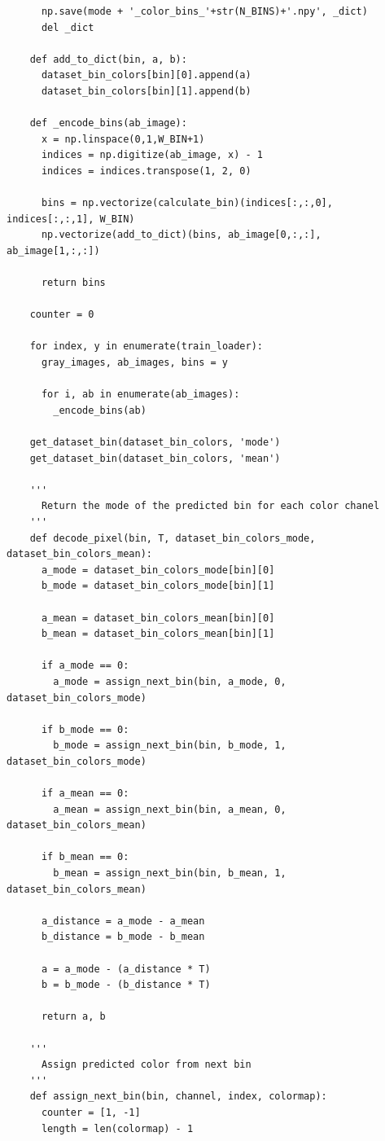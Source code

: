 \begin{longlisting}
\begin{verbatim}
      np.save(mode + '_color_bins_'+str(N_BINS)+'.npy', _dict)
      del _dict

    def add_to_dict(bin, a, b):
      dataset_bin_colors[bin][0].append(a)
      dataset_bin_colors[bin][1].append(b)

    def _encode_bins(ab_image):
      x = np.linspace(0,1,W_BIN+1)
      indices = np.digitize(ab_image, x) - 1
      indices = indices.transpose(1, 2, 0)
      
      bins = np.vectorize(calculate_bin)(indices[:,:,0], indices[:,:,1], W_BIN)
      np.vectorize(add_to_dict)(bins, ab_image[0,:,:], ab_image[1,:,:])

      return bins

    counter = 0

    for index, y in enumerate(train_loader):
      gray_images, ab_images, bins = y
        
      for i, ab in enumerate(ab_images):
        _encode_bins(ab)

    get_dataset_bin(dataset_bin_colors, 'mode')
    get_dataset_bin(dataset_bin_colors, 'mean')

    '''
      Return the mode of the predicted bin for each color chanel
    '''
    def decode_pixel(bin, T, dataset_bin_colors_mode, dataset_bin_colors_mean):
      a_mode = dataset_bin_colors_mode[bin][0]
      b_mode = dataset_bin_colors_mode[bin][1]

      a_mean = dataset_bin_colors_mean[bin][0]
      b_mean = dataset_bin_colors_mean[bin][1]

      if a_mode == 0:
        a_mode = assign_next_bin(bin, a_mode, 0, dataset_bin_colors_mode)

      if b_mode == 0:
        b_mode = assign_next_bin(bin, b_mode, 1, dataset_bin_colors_mode)

      if a_mean == 0:
        a_mean = assign_next_bin(bin, a_mean, 0, dataset_bin_colors_mean)

      if b_mean == 0:
        b_mean = assign_next_bin(bin, b_mean, 1, dataset_bin_colors_mean)
      
      a_distance = a_mode - a_mean
      b_distance = b_mode - b_mean

      a = a_mode - (a_distance * T)
      b = b_mode - (b_distance * T)

      return a, b

    '''
      Assign predicted color from next bin
    '''
    def assign_next_bin(bin, channel, index, colormap):
      counter = [1, -1]
      length = len(colormap) - 1


\end{verbatim}
\end{longlisting}
